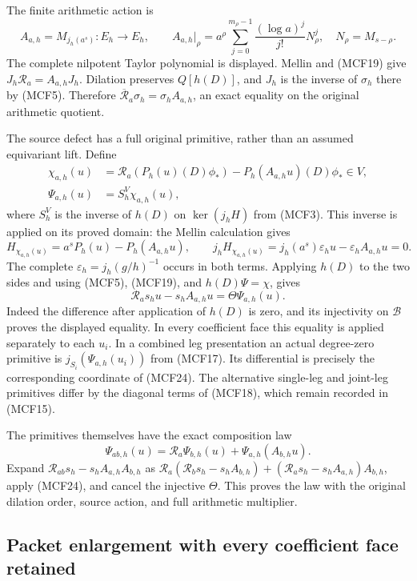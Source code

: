 The finite arithmetic action is
\[
A_{a,h}=M_{j_h(a^s)}:E_h\longrightarrow E_h,\qquad
A_{a,h}|_\rho=a^\rho\sum_{j=0}^{m_\rho-1}
             \frac{(\log a)^j}{j!}N_\rho^j,\quad N_\rho=M_{s-\rho}.
\tag{MCF21}
\]
The complete nilpotent Taylor polynomial is displayed.  Mellin and (MCF19)
give $J_h\mathcal R_a=A_{a,h}J_h$.  Dilation preserves $Q[h(D)]$, and
$J_h$ is the inverse of $\sigma_h$ there by (MCF5).  Therefore
$\overline{\mathcal R}_a\sigma_h=\sigma_hA_{a,h}$, an exact equality
on the original arithmetic quotient.

The source defect has a full original primitive, rather than an assumed
equivariant lift.  Define
\[
\begin{split}
\chi_{a,h}(u)&=\mathcal R_a(P_h(u)(D)\phi_*)
                       -P_h(A_{a,h}u)(D)\phi_*\in V,\\
\Psi_{a,h}(u)&=S_h^V\chi_{a,h}(u),
\end{split}
\tag{MCF22}
\]
where $S_h^V$ is the inverse of $h(D)$ on $\ker(j_hH)$ from (MCF3).
This inverse is applied on its proved domain: the Mellin calculation gives
\[
H_{\chi_{a,h}(u)}=a^sP_h(u)-P_h(A_{a,h}u),\qquad
j_hH_{\chi_{a,h}(u)}
 =j_h(a^s)\varepsilon_hu-\varepsilon_hA_{a,h}u=0.
\tag{MCF23}
\]
The complete $\varepsilon_h=j_h(g/h)^{-1}$ occurs in both terms.
Applying $h(D)$ to the two sides and using (MCF5), (MCF19), and
$h(D)\Psi=\chi$, gives
\[
\mathcal R_as_hu-s_hA_{a,h}u=\Theta\Psi_{a,h}(u).
\tag{MCF24}
\]
Indeed the difference after application of $h(D)$ is zero, and its
injectivity on $\mathscr B$ proves the displayed equality.  In every
coefficient face this equality is applied separately to each $u_i$.
In a combined leg presentation an actual degree-zero primitive is
$j_{S_i}(\Psi_{a,h}(u_i))$ from (MCF17).  Its differential is precisely
the corresponding coordinate of (MCF24).  The alternative single-leg
and joint-leg primitives differ by the diagonal terms of (MCF18),
which remain recorded in (MCF15).

The primitives themselves have the exact composition law
\[
\Psi_{ab,h}(u)=\mathcal R_a\Psi_{b,h}(u)
                         +\Psi_{a,h}(A_{b,h}u).
\tag{MCF25}
\]
Expand $\mathcal R_{ab}s_h-s_hA_{a,h}A_{b,h}$ as
$\mathcal R_a(\mathcal R_bs_h-s_hA_{b,h})
 +(\mathcal R_as_h-s_hA_{a,h})A_{b,h}$, apply (MCF24), and cancel the
injective $\Theta$.  This proves the law with the original dilation
order, source action, and full arithmetic multiplier.

\subsection{Packet enlargement with every coefficient face retained}

